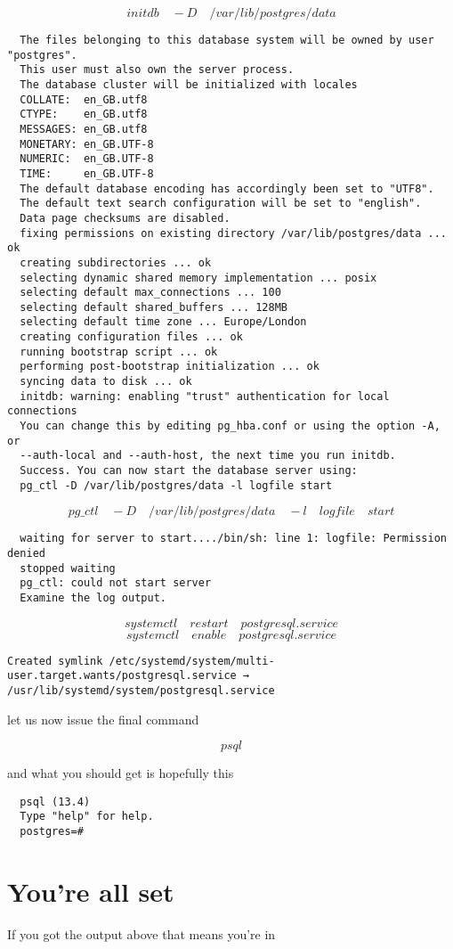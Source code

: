 \documentclass[a4paper,12pt]{article}
\begin{document}
\[ initdb \quad -D \quad /var/lib/postgres/data \]

\begin{lstlisting}
  The files belonging to this database system will be owned by user "postgres".
  This user must also own the server process.   
  The database cluster will be initialized with locales   
  COLLATE:  en_GB.utf8   
  CTYPE:    en_GB.utf8   
  MESSAGES: en_GB.utf8   
  MONETARY: en_GB.UTF-8   
  NUMERIC:  en_GB.UTF-8   
  TIME:     en_GB.UTF-8   
  The default database encoding has accordingly been set to "UTF8".   
  The default text search configuration will be set to "english".   
  Data page checksums are disabled.   
  fixing permissions on existing directory /var/lib/postgres/data ... ok   
  creating subdirectories ... ok   
  selecting dynamic shared memory implementation ... posix   
  selecting default max_connections ... 100   
  selecting default shared_buffers ... 128MB   
  selecting default time zone ... Europe/London   
  creating configuration files ... ok   
  running bootstrap script ... ok   
  performing post-bootstrap initialization ... ok   
  syncing data to disk ... ok    
  initdb: warning: enabling "trust" authentication for local connections   
  You can change this by editing pg_hba.conf or using the option -A, or   
  --auth-local and --auth-host, the next time you run initdb.   
  Success. You can now start the database server using:   
  pg_ctl -D /var/lib/postgres/data -l logfile start    
\end{lstlisting}


\[ pg\_ctl \quad -D \quad /var/lib/postgres/data \quad -l \quad logfile  \quad start \]








\begin{lstlisting}
  waiting for server to start..../bin/sh: line 1: logfile: Permission denied   
  stopped waiting   
  pg_ctl: could not start server   
  Examine the log output.   
\end{lstlisting}







\[systemctl \quad restart \quad postgresql.service \]
\[systemctl \quad enable \quad postgresql.service \]


\begin{lstlisting}
Created symlink /etc/systemd/system/multi-user.target.wants/postgresql.service → /usr/lib/systemd/system/postgresql.service
\end{lstlisting}

let us now issue the final command

\[ psql \]

and what you should get is hopefully this

\begin{lstlisting}
  psql (13.4)  
  Type "help" for help.  
  postgres=#    
\end{lstlisting}

\section{You're all set}

If you got the output above that means you're in

\printindex
\end{document}
